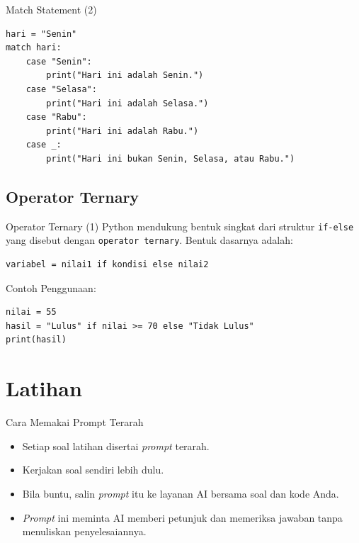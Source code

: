 \documentclass[aspectratio=169, table]{beamer}
\begin{document}
\begin{frame}[fragile]{Match Statement (2)}
\begin{lstlisting}[style=PythonStyle, caption={match_statement.py}]
hari = "Senin"
match hari:
    case "Senin":
        print("Hari ini adalah Senin.")
    case "Selasa":
        print("Hari ini adalah Selasa.")
    case "Rabu":
        print("Hari ini adalah Rabu.")
    case _:
        print("Hari ini bukan Senin, Selasa, atau Rabu.")
\end{lstlisting}
\end{frame}

\subsection{Operator Ternary}

\begin{frame}[fragile]{Operator Ternary (1)}
Python mendukung bentuk singkat dari struktur \texttt{if-else} yang disebut dengan \texttt{operator ternary}. Bentuk dasarnya adalah:

\begin{lstlisting}[style=PythonStyle]
variabel = nilai1 if kondisi else nilai2
\end{lstlisting}

Contoh Penggunaan:

\begin{lstlisting}[style=PythonStyle, caption={ternary_operator.py}]
nilai = 55
hasil = "Lulus" if nilai >= 70 else "Tidak Lulus"
print(hasil)
\end{lstlisting}
\end{frame}

\section{Latihan}
\begin{frame}{Cara Memakai Prompt Terarah}
\begin{itemize}
\item Setiap soal latihan disertai \textit{prompt} terarah.
\item Kerjakan soal sendiri lebih dulu.
\item Bila buntu, salin \textit{prompt} itu ke layanan AI bersama soal dan kode Anda.
\item \textit{Prompt} ini meminta AI memberi petunjuk dan memeriksa jawaban tanpa menuliskan penyelesaiannya.
\end{itemize}
\end{frame}
\end{document}
